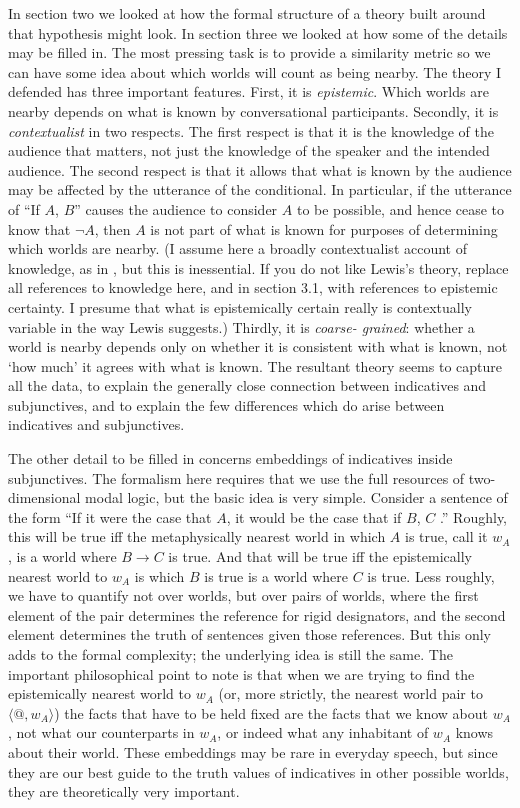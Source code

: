 In section two we looked at how the formal structure of a theory built around that hypothesis might look. In section three we looked at how some of the details may be filled in. The most pressing task is to provide a similarity metric so we can have some idea about which worlds will count as being nearby. The theory I defended has three important features. First, it is \textit{epistemic}. Which worlds are nearby depends on what is known by conversational participants. Secondly, it is \textit{contextualist} in two respects. The first respect is that it is the knowledge of the audience that matters, not just the knowledge of the speaker and the intended audience. The second respect is that it allows that what is known by the audience may be affected by the utterance of the conditional. In particular, if the utterance of ``If \(A\), \(B\)'' causes the audience to consider \(A\) to be possible, and hence cease to know that \(\neg A\), then \(A\) is not part of what is known for purposes of determining which worlds are nearby. (I assume here a broadly contextualist account of knowledge, as in \citet{Lewis1996b}, but this is inessential. If you do not like Lewis's theory, replace all references to knowledge here, and in section 3.1, with references to epistemic certainty. I presume that what is epistemically certain really is contextually variable in the way Lewis suggests.) Thirdly, it is \textit{coarse\nobreakdash- grained}: whether a world is nearby depends only on whether it is consistent with what is known, not `how much' it agrees with what is known. The resultant theory seems to capture all the data, to explain the generally close connection between indicatives and subjunctives, and to explain the few differences which do arise between indicatives and subjunctives. 

The other detail to be filled in concerns embeddings of indicatives inside subjunctives. The formalism here requires that we use the full resources of two\nobreakdash- dimensional modal logic, but the basic idea is very simple. Consider a sentence of the form ``If it were the case that \(A\), it would be the case that if \(B\), \(C\) .'' Roughly, this will be true iff the metaphysically nearest world in which \(A\) is true, call it \(w_A\), is a world where \(B \rightarrow C\) is true. And that will be true iff the epistemically nearest world to \(w_A\) is which \(B\) is true is a world where \(C\) is true. Less roughly, we have to quantify not over worlds, but over pairs of worlds, where the first element of the pair determines the reference for rigid designators, and the second element determines the truth of sentences given those references. But this only adds to the formal complexity; the underlying idea is still the same. The important philosophical point to note is that when we are trying to find the epistemically nearest world to \(w_A\) (or, more strictly, the nearest world pair to \(\langle @, w_A \rangle\)) the facts that have to be held fixed are the facts that we know about \(w_A\), not what our counterparts in \(w_A\), or indeed what any inhabitant of \(w_A\) knows about their world. These embeddings may be rare in everyday speech, but since they are our best guide to the truth values of indicatives in other possible worlds, they are theoretically very important.%
